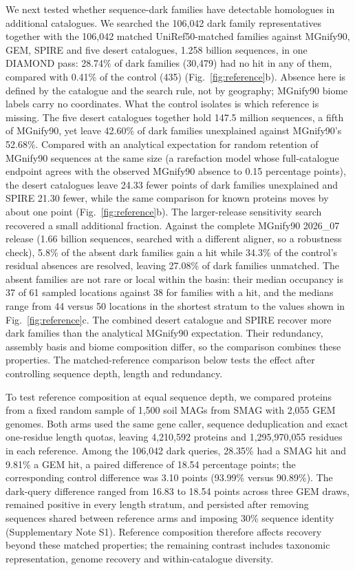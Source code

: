 \documentclass[11pt]{article}
\begin{document}
We next tested whether sequence-dark families have detectable homologues in additional catalogues. We searched
the 106{,}042 dark family representatives together with the 106{,}042 matched UniRef50-matched
families against MGnify90, GEM, SPIRE and five desert catalogues, 1.258 billion sequences, in one
DIAMOND pass: 28.74\% of dark families (30{,}479) had no hit in any of them, compared with 0.41\% of
the control (435) (Fig.~\ref{fig:reference}b). Absence here is defined by the catalogue and the
search rule, not by geography; MGnify90 biome labels carry no coordinates. What the control isolates
is which reference is missing. The five desert catalogues together hold 147.5 million sequences, a
fifth of MGnify90, yet leave 42.60\% of dark families unexplained against MGnify90's 52.68\%.
Compared with an analytical expectation for random retention of MGnify90 sequences at the same size (a rarefaction model whose full-catalogue endpoint agrees with the
observed MGnify90 absence to 0.15 percentage points), the desert catalogues leave 24.33 fewer points
of dark families unexplained and SPIRE 21.30 fewer, while the same comparison for known proteins moves
by about one point (Fig.~\ref{fig:reference}b). The larger-release sensitivity search recovered a small additional fraction. Against the complete
MGnify90 2026\_07 release (1.66 billion sequences, searched with a different aligner, so a robustness
check), 5.8\% of
the absent dark families gain a hit while 34.3\% of the control's residual absences are resolved,
leaving 27.08\% of dark families unmatched. The absent families are not rare or local within the
basin: their median occupancy is 37 of 61 sampled locations against 38 for families with a hit, and
the medians range from 44 versus 50 locations in the shortest stratum to the values shown in Fig.~\ref{fig:reference}c. The combined desert catalogue and SPIRE recover more dark families than the analytical MGnify90
expectation. Their redundancy, assembly basis and biome composition differ, so the comparison
combines these properties. The matched-reference comparison below tests the effect after controlling sequence depth, length and redundancy.

To test reference composition at equal sequence depth, we compared proteins from a fixed random
sample of 1{,}500 soil MAGs from SMAG \citep{ma2023smag} with 2{,}055 GEM genomes.
Both arms used the same gene caller, sequence deduplication and exact one-residue length quotas,
leaving 4{,}210{,}592 proteins and 1{,}295{,}970{,}055 residues in each reference.
Among the 106{,}042 dark queries, 28.35\% had a SMAG hit and 9.81\% a GEM hit, a paired difference
of 18.54 percentage points; the corresponding control difference was 3.10 points
(93.99\% versus 90.89\%). The dark-query difference ranged from 16.83 to 18.54 points across
three GEM draws, remained positive in every length stratum, and persisted after removing
sequences shared between reference arms and imposing 30\% sequence identity
(Supplementary Note S1). Reference composition therefore affects recovery beyond these matched
properties; the remaining contrast includes taxonomic representation, genome recovery and
within-catalogue diversity.
\end{document}

